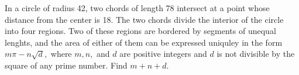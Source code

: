 In a circle of radius 42, two chords of length 78 intersect at a point whose distance from the center is 18.  The two chords divide the interior of the circle into four regions.  Two of these regions are bordered by segments of unequal lenghts, and the area of either of them can be expressed uniquley in the form $m\pi-n\sqrt{d},$ where $m, n,$ and $d$ are positive integers and $d$ is not divisible by the square of any prime number.  Find $m+n+d.$